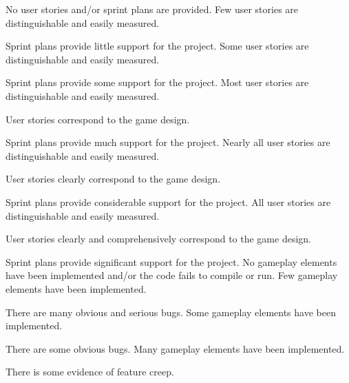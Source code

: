 \documentclass{../fal_assignment}
\begin{document}
\begin{markingrubric}
%
        \grade\fail No user stories and/or sprint plans are provided.
        \grade Few user stories are distinguishable and easily measured.
            \par Sprint plans provide little support for the project.
        \grade Some user stories are distinguishable and easily measured.
            \par Sprint plans provide some support for the project.
        \grade Most user stories are distinguishable and easily measured.
            \par User stories correspond to the game design.
            \par Sprint plans provide much support for the project.
        \grade Nearly all user stories are distinguishable and easily measured.
            \par User stories clearly correspond to the game design.
            \par Sprint plans provide considerable support for the project.
        \grade All user stories are distinguishable and easily measured.
            \par User stories clearly and comprehensively correspond to the game design.
            \par Sprint plans provide significant support for the project.
%
        \grade\fail No gameplay elements have been implemented and/or the code fails to compile or run.
        \grade Few gameplay elements have been implemented.
            \par There are many obvious and serious bugs.
        \grade Some gameplay elements have been implemented.
            \par There are some obvious bugs.
        \grade Many gameplay elements have been implemented.
            \par There is some evidence of feature creep.

\end{markingrubric}
\end{document}

